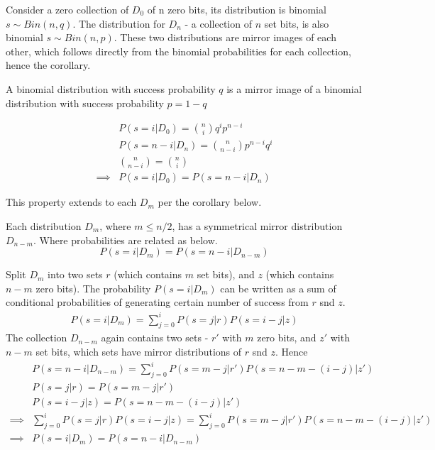 \documentclass[11pt]{article}
\begin{document}
Consider a zero collection of $D_0$ of n zero bits, its distribution is  binomial $s \sim Bin(n,q)$.  The distribution for $D_n$ - a collection of $n$ set bits, is also binomial $s \sim Bin(n,p)$. These two distributions are mirror images of each other, which follows directly from the binomial probabilities for each collection, hence the corollary.
 \begin{cor}\label{cor:binsym}
 A binomial distribution with success probability $q$ is a mirror image of a binomial distribution with success probability $p=1-q$
 \begin{pf}
 \begin{align*}
& P(s=i | D_0) = \binom{n}{i} q^ip^{n-i} \\
&  P(s=n-i | D_n) = \binom{n}{n-i} p^{n-i} q^i \\
&  \binom{n}{n-i} = \binom{n}{i}  \\
\implies & P(s=i | D_0) = P(s=n-i | D_n)
 \end{align*}
 \end{pf}
 \end{cor}
 
 This property extends to each $D_m$ per the corollary  below.
 \begin{cor}\label{cor:sym}
Each distribution $D_m$, where $m \le n/2$, has a symmetrical mirror distribution $D_{n-m}$. Where probabilities are related as below.
\[ P(s=i | D_m) = P(s=n-i | D_{n-m}) \]
\begin{pf}
Split $D_m$ into two sets $r$ (which contains $m$ set bits), and $z$ (which contains $n-m$ zero bits).  The probability $P(s=i | D_m)$ can be written as a sum of conditional probabilities of generating certain number of success from $r$ snd $z$.
 \begin{align*}
 P(s=i | D_m) =  \sum_{j=0}^{i} P(s=j | r) P(s = i-j | z)
 \end{align*}
 The collection $D_{n-m}$ again contains two sets - $r'$ with $m$ zero bits, and $z'$ with $n-m$ set bits, which sets have mirror distributions of $r$ snd $z$. Hence
  \begin{align*}
 & P(s=n - i | D_{n-m}) =  \sum_{j=0}^{i} P(s= m - j | r') P(s = n - m - (i-j) | z') \\
 & P(s=j | r) = P(s= m - j | r')  \\
 & P(s = i-j | z) = P(s = n - m - (i-j) | z') \\
 \implies &   \sum_{j=0}^{i} P(s=j | r) P(s = i-j | z) = \sum_{j=0}^{i} P(s= m - j | r') P(s = n - m - (i-j) | z') \\
 \implies & P(s=i | D_m)  = P(s=n - i | D_{n-m})
 \end{align*}
\end{pf}
\end{cor}
\end{document}
